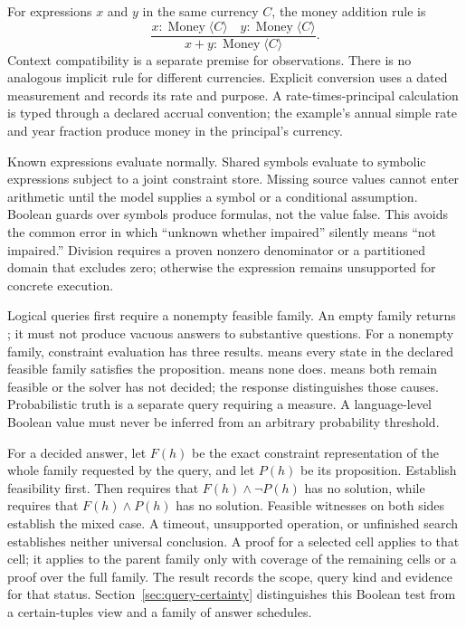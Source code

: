 For expressions $x$ and $y$ in the same currency $C$, the money addition rule is
\[
 \frac{x:\operatorname{Money}\langle C\rangle\quad
       y:\operatorname{Money}\langle C\rangle}
      {x+y:\operatorname{Money}\langle C\rangle}.
\]
Context compatibility is a separate premise for observations. There is no
analogous implicit rule for different currencies. Explicit conversion uses
a dated measurement and records its rate and purpose. A rate-times-principal
calculation is typed through a declared accrual convention; the example's
annual simple rate and year fraction produce money in the principal's currency.

Known expressions evaluate normally. Shared symbols evaluate to symbolic
expressions subject to a joint constraint store. Missing source values cannot
enter arithmetic until the model supplies a symbol or a conditional assumption.
Boolean guards over symbols produce formulas, not the value false. This avoids
the common error in which ``unknown whether impaired'' silently means
``not impaired.'' Division requires a proven nonzero denominator or a
partitioned domain that excludes zero; otherwise the expression remains
unsupported for concrete execution.

Logical queries first require a nonempty feasible family. An empty family
returns ; it must not produce vacuous answers to substantive
questions. For a nonempty family, constraint evaluation has three results.
 means every state in
the declared feasible family satisfies the proposition.  means
none does.  means both remain feasible or the solver has
not decided; the response distinguishes those causes. Probabilistic truth is
a separate query requiring a measure. A language-level Boolean value must
never be inferred from an arbitrary probability threshold.

For a decided answer, let $F(h)$ be the exact constraint representation of the
whole family requested by the query, and let $P(h)$ be its proposition.
Establish feasibility first. Then  requires that
$F(h)\land\neg P(h)$ has no solution, while  requires that
$F(h)\land P(h)$ has no solution. Feasible witnesses on both sides establish
the mixed case. A timeout, unsupported operation, or unfinished search
establishes neither universal conclusion. A proof for a selected cell applies
to that cell; it applies to the parent family only with coverage of the
remaining cells or a proof over the full family. The result records the
scope, query kind and evidence for that status.
Section~\ref{sec:query-certainty} distinguishes this Boolean test from a
certain-tuples view and a family of answer schedules.


